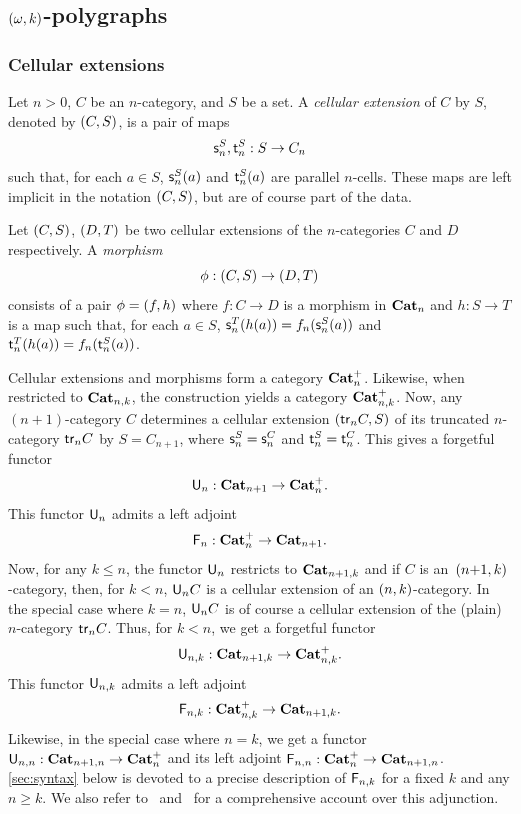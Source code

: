  \subsection{\texorpdfstring{$(\omega,k)$}{(ω,k)}-polygraphs}\label{subsec:okpol}
 \subsubsection{Cellular extensions}\label{ssubsec:cellext}
 Let $n>0$, $C$ be an $n$-category, and $S$ be a set. A {\em cellular
   extension} of $C$ by $S$, denoted by $(C,S)$, is a pair of maps
 \[\mathsf{s}_{n}^S,\mathsf{t}_{n}^S:S\to C_n\]
 such that, for each $a\in S$, $\mathsf{s}_{n}^S(a)$ and $\mathsf{t}_{n}^S(a)$ are
 parallel $n$-cells. These maps are left implicit in the notation
 $(C,S)$, but
 are of course part of the data. 
 
Let $(C,S)$, $(D,T)$ be two cellular extensions of the
$n$-categories $C$ and $D$ respectively.  A {\em morphism}
 \[\phi:(C,S)\to(D,T)\]
 consists of a pair $\phi=(f,h)$ where $f:C\to D$ is a morphism in
 $\mathbf{Cat}_{n}$ and $h:S\to T$ is a map such that, for each $a\in S$, $\mathsf{s}_{n}^T(h(a))=f_n(\mathsf{s}_{n}^S(a))$ and $\mathsf{t}_{n}^T(h(a))=f_n(\mathsf{t}_{n}^S(a))$.

 Cellular extensions and morphisms form a category $\mathbf{Cat}_{n}^{+}$. Likewise, when restricted to $\mathbf{Cat}_{n,k}$, the
 construction yields a category $\mathbf{Cat}_{n,k}^{+}$. Now,
 any $(n{+}1)$-category $C$ determines a cellular extension $(\mathsf{tr}_{n} C,S)$ of its truncated $n$-category $\mathsf{tr}_{n} C$ by
 $S=C_{n+1}$, where $\mathsf{s}_{n}^S=\mathsf{s}_{n}^C$ and $\mathsf{t}_{n}^S=\mathsf{t}_{n}^C$.
 This gives a forgetful functor
 \[\mathsf{U}_{n}:\mathbf{Cat}_{n+1}\to \mathbf{Cat}_{n}^{+}.\]
 This functor $\mathsf{U}_{n}$ admits a left adjoint
 \[\mathsf{F}_{n}:\mathbf{Cat}_{n}^{+}\to\mathbf{Cat}_{n+1}.\]
Now, for any $k\leq n$, the functor $\mathsf{U}_{n}$ restricts to
$\mathbf{Cat}_{n+1,k}$ and if $C$ is an~$(n{+}1,k)$-category, then,
for $k<n$, 
$\mathsf{U}_{n}C$ is a cellular extension of an $(n,k)$-category. In the
special case where $k=n$, $\mathsf{U}_{n}C$ is of course a cellular extension
of the (plain) $n$-category $\mathsf{tr}_{n}C$.
Thus, for $k<n$, we get a forgetful functor
\[\mathsf{U}_{n,k}:\mathbf{Cat}_{n+1,k}\to \mathbf{Cat}_{n,k}^{+}.\]
This functor $\mathsf{U}_{n,k}$ admits a left adjoint
\[\mathsf{F}_{n,k}:\mathbf{Cat}_{n,k}^{+}\to \mathbf{Cat}_{n+1,k}.\]
Likewise, in the special case where $n=k$, we get a functor $\mathsf{U}_{n,n}:\mathbf{Cat}_{n+1,n}\to \mathbf{Cat}_{n}^{+}$
and its left adjoint $\mathsf{F}_{n,n}:\mathbf{Cat}_{n}^{+}\to \mathbf{Cat}_{n+1,n}$.
\cref{sec:syntax} below is devoted to a precise description of $\mathsf{F}_{n,k}$ for a fixed $k$ and any $n\geq k$.
We also refer to~\cite{batanin:comfmg} and~\cite[Ch.18]{abgmmm:polybk} for
a comprehensive account over this adjunction. 

